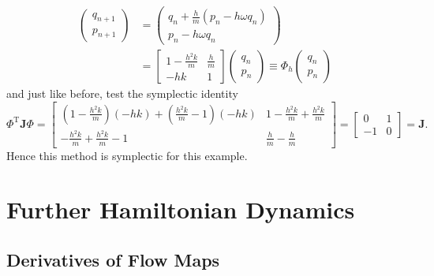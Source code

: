\documentclass{report}
\theoremstyle{exampstyle} \newtheorem{example}[theorem]{Example}
\theoremstyle{exampstyle} \newtheorem{remark}[theorem]{Remark}
\theoremstyle{exampstyle} \newtheorem{definition}[theorem]{Definition}
\theoremstyle{exampstyle} \newtheorem{lemma}[theorem]{Lemma}
\theoremstyle{exampstyle} \newtheorem{proposition}[theorem]{Proposition}
\begin{document}
\begin{equation*}
	\begin{aligned}
		\begin{pmatrix}
			q_{n+1} \\
			p_{n+1} 
		\end{pmatrix} &= \begin{pmatrix}
			q_{n} + \frac{h}{m} \left( p_{n} - h \omega q_n \right) \\
			p_{n} - h \omega q_n
		\end{pmatrix} \\
		&= \begin{bmatrix}
			1 - \frac{h^2 k}{m} & \frac{h}{m} \\
			-hk & 1
		\end{bmatrix} \begin{pmatrix}
			q_n \\
			p_n
		\end{pmatrix} \equiv \Phi_h \begin{pmatrix}
			q_n \\
			p_n
		\end{pmatrix}
	\end{aligned}
\end{equation*}
and just like before, test the symplectic identity
\begin{equation*}
	\Phi^\mathrm{T}\mathbf{J}\Phi = \begin{bmatrix}
		\left(1-\frac{h^2 k}{m}\right)(-hk) + \left(\frac{h^2 k}{m}-1\right)(-hk) & 1 - \frac{h^2 k}{m} + \frac{h^2 k}{m} \\
		-\frac{h^2 k}{m} + \frac{h^2 k}{m} -1 & \frac{h}{m} - \frac{h}{m}
	\end{bmatrix} = \begin{bmatrix}
		0 & 1 \\
		-1 & 0
	\end{bmatrix} = \mathbf{J}.
\end{equation*}
Hence this method is symplectic for this example.

\section{Further Hamiltonian Dynamics}

\subsection{Derivatives of Flow Maps}
\end{document}
